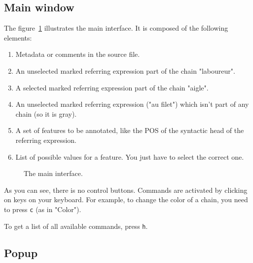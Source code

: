 \documentclass[12pt]{article}
\begin{document}
 \subsection{Main window}

The figure~\ref{fig:main-interface-at-a-glance} illustrates the main
interface.  It is composed of the following elements:
\begin{enumerate}
   \item Metadata or comments in the source file.
   \item An unselected marked referring expression part of the chain
   "laboureur".
   \item A selected marked referring expression part of the chain "aigle".
   \item An unselected marked referring expression ("au filet") which isn't
   part of any chain (so it is gray).
   \item A set of features to be annotated, like the POS of the syntactic head
   of the referring expression.
   \item List of possible values for a feature.  You just have to select the
   correct one.
\end{enumerate}

\begin{figure}
\begin{center}
{%
\setlength{\fboxsep}{0pt}%
}
\end{center}
\caption{The main interface.}
\label{fig:main-interface-at-a-glance}
\end{figure}

As you can see, there is no control buttons.  Commands are activated by
clicking on keys on your keyboard.  For example, to change the color of a
chain, you need to press \verb|c| (as in "Color").

To get a list of all available commands, press \verb|h|.


 \subsection{Popup}
\end{document}
